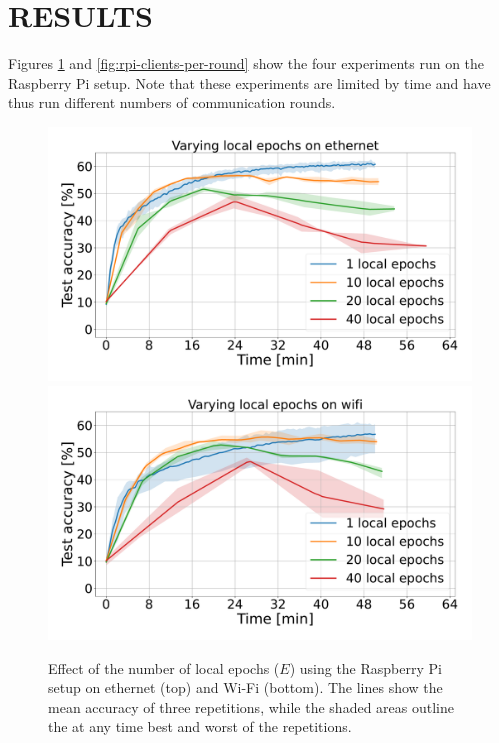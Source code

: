 \documentclass{article}
\begin{document}
\section{RESULTS}%
\label{sec:results}
Figures \ref{fig:rpi-local-epochs} and \ref{fig:rpi-clients-per-round} show the four experiments run on the Raspberry Pi setup.
Note that these experiments are limited by time and have thus run different numbers of communication rounds.
\begin{figure}[htb!]
    \centering
    \includegraphics[width=\linewidth]{imgs/time_avg_local_epochs_ethernet.pdf}
    \includegraphics[width=\linewidth]{imgs/time_avg_local_epochs_wifi.pdf}
    \caption{Effect of the number of local epochs ($E$) using the Raspberry Pi setup on ethernet (top) and Wi-Fi (bottom).
    The lines show the mean accuracy of three repetitions, while the shaded areas outline the at any time best and worst of the repetitions.}
    \label{fig:rpi-local-epochs}
\end{figure}\noindent
\end{document}
